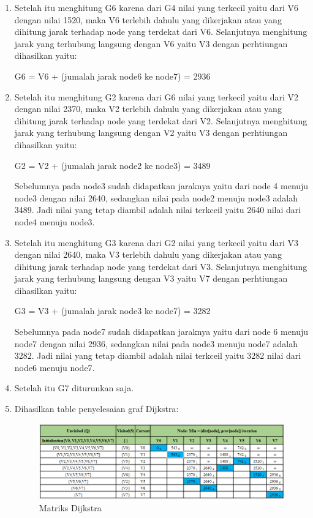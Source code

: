\begin{enumerate}
\begin{enumerate}
        \item Setelah itu menghitung G6 karena dari G4 nilai yang terkecil yaitu dari V6 dengan nilai 1520, maka V6 terlebih dahulu yang dikerjakan atau yang dihitung jarak terhadap node yang terdekat dari V6. Selanjutnya menghitung jarak yang terhubung langsung dengan V6 yaitu V3 dengan perhtiungan dihasilkan yaitu:
            \par G6 = V6 + (jumalah jarak node6 ke node7) = 2936

        \item Setelah itu menghitung G2 karena dari G6 nilai yang terkecil yaitu dari V2 dengan nilai 2370, maka V2 terlebih dahulu yang dikerjakan atau yang dihitung jarak terhadap node yang terdekat dari V2. Selanjutnya menghitung jarak yang terhubung langsung dengan V2 yaitu V3 dengan perhtiungan dihasilkan yaitu:
            \par G2 = V2 + (jumalah jarak node2 ke node3) = 3489
            \par Sebelumnya pada node3 sudah didapatkan jaraknya yaitu dari node 4 menuju node3 dengan nilai 2640, sedangkan nilai pada node2 menuju node3 adalah 3489. Jadi nilai yang tetap diambil adalah nilai terkceil yaitu 2640 nilai dari node4 menuju node3.

        \item Setelah itu menghitung G3 karena dari G2 nilai yang terkecil yaitu dari V3 dengan nilai 2640, maka V3 terlebih dahulu yang dikerjakan atau yang dihitung jarak terhadap node yang terdekat dari V3. Selanjutnya menghitung jarak yang terhubung langsung dengan V3 yaitu V7 dengan perhtiungan dihasilkan yaitu:
            \par G3 = V3 + (jumalah jarak node3 ke node7) = 3282
            \par Sebelumnya pada node7 sudah didapatkan jaraknya yaitu dari node 6 menuju node7 dengan nilai 2936, sedangkan nilai pada node3 menuju node7 adalah 3282. Jadi nilai yang tetap diambil adalah nilai terkceil yaitu 3282 nilai dari node6 menuju node7.
        
        \item Setelah itu G7 diturunkan saja.
        
        \item Dihasilkan table penyelesaian graf Dijkstra:
            \begin{figure}[h]
            \centering
            \includegraphics[scale=0.45]{figures/ALGORITMA/Matriks_Dijkstra.png}
            \caption{Matriks Dijkstra}
            \label{gambar52}
            \end{figure}
            
    \end{enumerate}
\end{enumerate}

